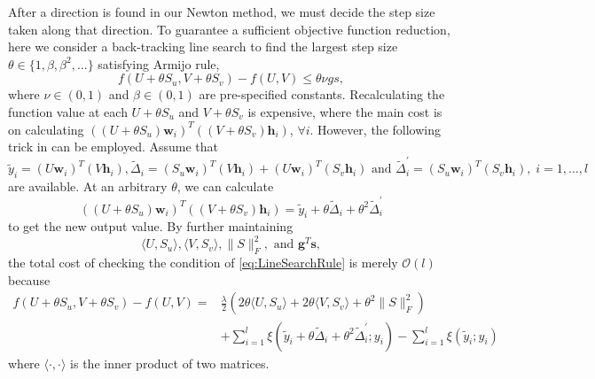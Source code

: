 \documentclass[11pt,twoside]{article}
\newcommand{\bsym}[1]{\ensuremath{\boldsymbol{#1}}}
\newcommand{\bw}{\ensuremath{\bsym{w}}}
\newcommand{\bh}{\ensuremath{\bsym{h}}}
\newcommand{\bs}{\ensuremath{\bsym{s}}}
\newcommand{\bg}{\ensuremath{\bsym{g}}}
\newcommand{\bbO}[1]{\ensuremath{\mathcal{O}\left(#1\right)}}
\begin{document}
After a direction is found in our Newton method, we must decide the step size taken along that direction. To guarantee a sufficient objective function reduction, here we consider a back-tracking line search to find the largest step size $\theta\in\{1,\beta,\beta^2,\dots\}$ satisfying Armijo rule,
\begin{equation}
    f(U+\theta S_{u},V+\theta S_{v}) - f(U,V) \le \theta\nu gs,
    \label{eq:LineSearchRule}
\end{equation}
where $\nu\in(0,1)$ and $\beta\in(0,1)$ are pre-specified constants.
Recalculating the function value at each $U+\theta S_{u}$ and $V+\theta S_{v}$ is expensive, where the main cost is on calculating $((U+\theta S_{u})\bw_i)^T((V+\theta S_{v})\bh_i)$, $\forall i$.
However, the following trick in \cite{GXY09a} can be employed.
Assume that
\begin{equation}
    \tilde{y}_i = (U\bw_i)^T(V\bh_i), \tilde{\Delta}_i=(S_u\bw_i)^T(V\bh_i)+(U\bw_i)^T(S_v\bh_i)\text{ and }\tilde{\Delta}_i^\prime = (S_u\bw_i)^T(S_v\bh_i),\; i=1,\dots,l    
    \label{eq:LsRequire}
\end{equation}
are available.
At an arbitrary $\theta$, we can calculate
\begin{equation}
    \left((U+\theta S_u)\bw_i\right)^T\left((V+\theta S_v)\bh_i\right) = \tilde{y}_i + \theta\tilde{\Delta}_i + {\theta}^2\tilde{\Delta}_i^\prime    
    \label{eq:ExpTheta}
\end{equation}
to get the new output value.
By further maintaining
\begin{equation}    
    \langle{U}{,}{S_u}\rangle,\langle{V}{,}{S_v}\rangle,\|S\|_F^2,\text{ and } {\bg}^T{\bs},
    \label{eq:LsRequire1}
\end{equation}
the total cost of checking the condition of \eqref{eq:LineSearchRule} is merely $\bbO{l}$ because
\begin{equation}
    \begin{aligned}
        f(U+\theta S_{u},V+\theta S_{v}) - f(U,V) =& \frac{\lambda}{2}\left( 2\theta \langle{U}{,}{S_u}\rangle + 2\theta \langle{V}{,}{S_v}\rangle + \theta^2\|S\|_F^2 \right)\\ 
        &+ \sum_{i=1}^l \xi(\tilde{y}_i + \theta\tilde{\Delta}_i + {\theta}^2\tilde{\Delta}_i^\prime;y_i) -\sum_{i=1}^l \xi(\tilde{y}_i;y_i)        
    \end{aligned}
    \label{eq:LrObjFast}
\end{equation}
where $\langle\cdot{,}\cdot\rangle$ is the inner product of two matrices.
\end{document}
